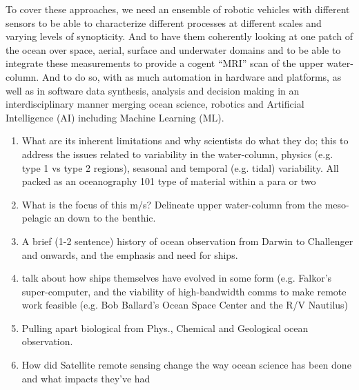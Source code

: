 To cover these approaches, we need an ensemble of robotic vehicles
with different sensors to be able to characterize different processes
at different scales and varying levels of synopticity. And to have
them coherently looking at one patch of the ocean over space, aerial,
surface and underwater domains and to be able to integrate
these measurements to provide a cogent ``MRI'' scan of the upper
water-column. And to do so, with as much automation in hardware and
platforms, as well as in software data synthesis, analysis and
decision making in an interdisciplinary manner merging ocean science,
robotics and Artificial Intelligence (AI) including Machine Learning
(ML). 


\begin{enumerate} 



\item What are its inherent limitations and why scientists do what
  they do; this to address the issues related to variability in the
  water-column, physics (e.g. type 1 vs type 2 regions), seasonal and
  temporal (e.g. tidal) variability. All packed as an oceanography 101
  type of material within a para or two

\item What is the focus of this m/s? Delineate upper water-column from the
meso-pelagic an down to the benthic.

\item A brief (1-2 sentence) history of ocean observation from Darwin to
Challenger and onwards, and the emphasis and need for ships.

\item talk about how ships themselves have evolved in some form
  (e.g. Falkor’s super-computer, and the viability of high-bandwidth
  comms to make remote work feasible (e.g. Bob Ballard’s Ocean Space
  Center and the R/V Nautilus)



\item Pulling apart biological from Phys., Chemical and Geological ocean
observation. 

\item How did Satellite remote sensing change the way ocean science has
been done and what impacts they've had

\end{enumerate}
